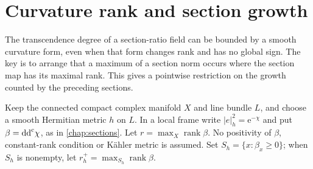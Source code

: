 \section{Curvature rank and section growth}
\label{sec:curvature-rank-section-growth}

The transcendence degree of a section-ratio field can be bounded by a smooth curvature form, even when that form changes rank and has no global sign. The key is to arrange that a maximum of a section norm occurs where the section map has its maximal rank. This gives a pointwise restriction on the growth counted by the preceding sections.

Keep the connected compact complex manifold $X$ and line bundle $L$, and choose a smooth Hermitian metric $h$ on $L$. In a local frame write $|e|_h^2=\mathrm e^{-\chi}$ and put $\beta=\mathrm{dd}^{\mathrm{c}}\chi$, as in \cref{chap:sections}. Let $r=\max_X\operatorname{rank}\beta$. No positivity of $\beta$, constant-rank condition or K\"ahler metric is assumed. Set $S_h=\{x:\beta_x\geq0\}$; when $S_h$ is nonempty, let $r_h^+=\max_{S_h}\operatorname{rank}\beta$.

